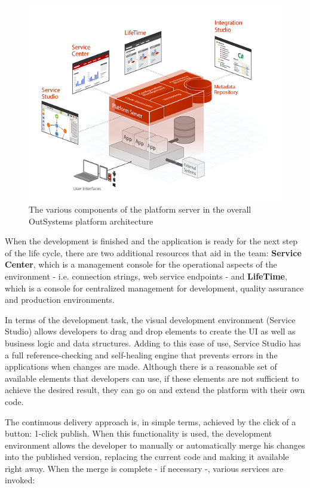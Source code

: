 \documentclass{sigchi}
\begin{document}
\begin{figure}[h!]
    \centering
	\includegraphics[width=0.9\columnwidth]{platform-server}
    \caption {The various components of the platform server in the overall OutSystems platform architecture}
    \label{fig:platformserver}
\end{figure}

When the development is finished and the application is ready for the next step of the life cycle, there are two additional resources that aid in the team: \textbf{Service Center}, which is a management console for the operational aspects of the environment - i.e. connection strings, web service endpoints - and \textbf{LifeTime}, which is a console for centralized management for development, quality assurance and production environments.

In terms of the development task, the visual development environment (Service Studio) allows developers to drag and drop elements to create the UI as well as business logic and data structures. Adding to this ease of use, Service Studio has a full reference-checking and self-healing engine that prevents errors in the applications when changes are made.  Although there is a reasonable set of available elements that developers can use, if these elements are not sufficient to achieve the desired result, they can go on and extend the platform with their own code.

The continuous delivery approach is, in simple terms, achieved by the click of a button: 1-click publish. When this functionality is used, the development environment allows the developer to manually or automatically merge his changes into the published version, replacing the current code and making it available right away. When the merge is complete - if necessary -, various services are invoked:
\end{document}
